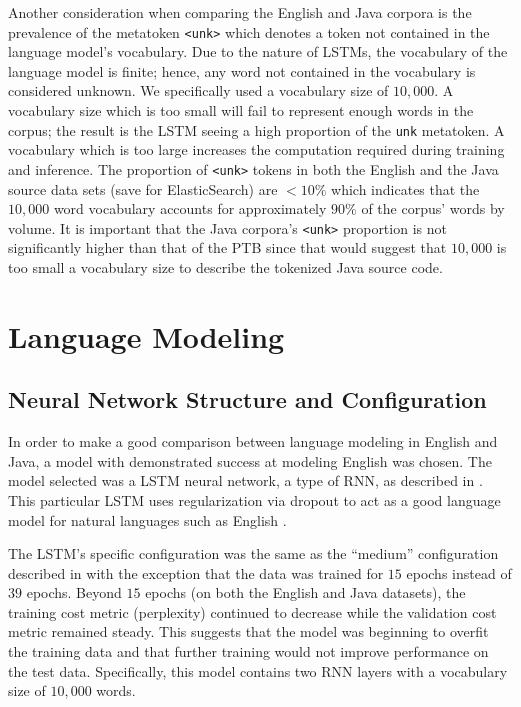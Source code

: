 \documentclass[runningheads,a4paper]{llncs}
\begin{document}
Another consideration when comparing the English and Java corpora is the
prevalence of the metatoken \texttt{<unk>} which denotes a token not contained
in the language model's vocabulary.
Due to the nature of LSTMs, the vocabulary of the language model is finite;
hence, any word not contained in the vocabulary is considered unknown.
We specifically used a vocabulary size of $10,000$. A vocabulary size which
is too small will fail to represent enough words in the corpus; the result
is the LSTM seeing a high proportion of the \texttt{unk} metatoken. A
vocabulary which is too large increases the computation required during
training and inference.
The proportion of \texttt{<unk>} tokens in both the English and the Java
source data sets (save for ElasticSearch) are $<10\%$ which indicates that
the $10,000$ word vocabulary accounts for approximately $90\%$ of the corpus'
words by volume. It is important that the Java corpora's \texttt{<unk>}
proportion is not significantly higher than that of the PTB since
that would suggest that $10,000$ is too small a vocabulary size to describe
the tokenized Java source code.

\section{Language Modeling}
\label{language-modeling}

\subsection{Neural Network Structure and Configuration}

In order to make a good comparison between language modeling in English
and Java, a model with demonstrated success at modeling English was
chosen. The model selected was a LSTM neural
network, a type of RNN, as described in
\citet{LSTMArticle}. This particular LSTM uses regularization via 
dropout to act as a good language model for natural languages
such as English \cite{LSTMArticle}.


The LSTM's specific configuration was the same as the ``medium''
configuration described in \citet{LSTMArticle} with the exception
that the data was trained for $15$ epochs instead of $39$ epochs.
Beyond $15$ epochs (on both the English and Java datasets), the 
training cost metric (perplexity) continued to decrease while the
validation cost metric remained steady. This suggests that the model
was beginning to overfit the training data and that further training
would not improve performance on the test data.
Specifically, this model contains two RNN layers with a vocabulary
size of $10,000$ words.
\end{document}
